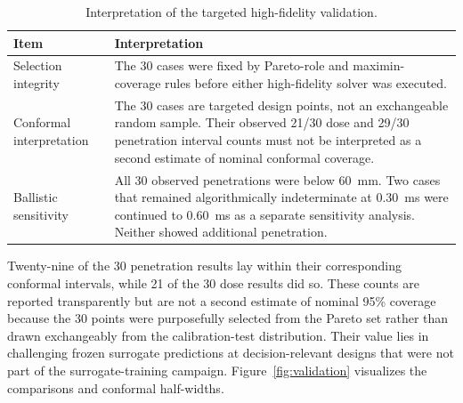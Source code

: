 \documentclass[12pt]{elsarticle}
\newcommand{\SI}[2]{#1~#2}
\newif\ifproductionnotes
\newcommand{\productionnote}[1]{%
\ifproductionnotes
\par\medskip\noindent\fcolorbox{black}{gray!12}{\begin{minipage}{0.94\linewidth}\footnotesize\textbf{Production note for the figure/table designer.} #1\end{minipage}}\par\medskip
\fi}
\begin{document}
	\begin{table}[htbp]
		\centering
		\caption{Interpretation of the targeted high-fidelity validation.}
		\label{tab:validation_qa}
		\small
		\begin{tabular}{@{}lp{}@{}}
			\toprule
			Item & Interpretation \\
			\midrule
			Selection integrity & The 30 cases were fixed by Pareto-role and maximin-coverage rules before either high-fidelity solver was executed. \\
			Conformal interpretation & The 30 cases are targeted design points, not an exchangeable random sample. Their observed 21/30 dose and 29/30 penetration interval counts must not be interpreted as a second estimate of nominal conformal coverage. \\
			Ballistic sensitivity & All 30 observed penetrations were below \SI{60}{mm}. Two cases that remained algorithmically indeterminate at \SI{0.30}{ms} were continued to \SI{0.60}{ms} as a separate sensitivity analysis. Neither showed additional penetration. \\
			\bottomrule
		\end{tabular}
	\end{table}
	\productionnote{\textbf{Tabela~\ref{tab:validation_qa} e Figura~\ref{fig:validation} --- briefing para Carlos.} Usar os mesmos tr\^es arquivos da Tabela~\ref{tab:validation}, no diret\'orio \texttt{Fase 5/VALIDACAO\_ALTA\_FIDELIDADE/fase4\_20261003\_043316\_MCNP63\_DEDF\_AP\_30/study\_30}. A figura deve ter dois pain\'eis de paridade, um para dose e outro para penetra\c{c}\~ao. Usar reta identidade, faixa de incerteza conformal, marcadores discretos para os 30 casos e uma linha de limite de \SI{60}{mm} no painel bal\'istico. Acrescentar uma nota visual de que 0,60 ms \`e uma sensibilidade separada para os casos 9016 e 9026, n\~ao uma altera\c{c}\~ao do conjunto oficial de 0,30 ms.}
	
	Twenty-nine of the 30 penetration results lay within their corresponding conformal intervals, while 21 of the 30 dose results did so. These counts are reported transparently but are not a second estimate of nominal 95\% coverage because the 30 points were purposefully selected from the Pareto set rather than drawn exchangeably from the calibration-test distribution. Their value lies in challenging frozen surrogate predictions at decision-relevant designs that were not part of the surrogate-training campaign. Figure~\ref{fig:validation} visualizes the comparisons and conformal half-widths.
	
\end{document}
